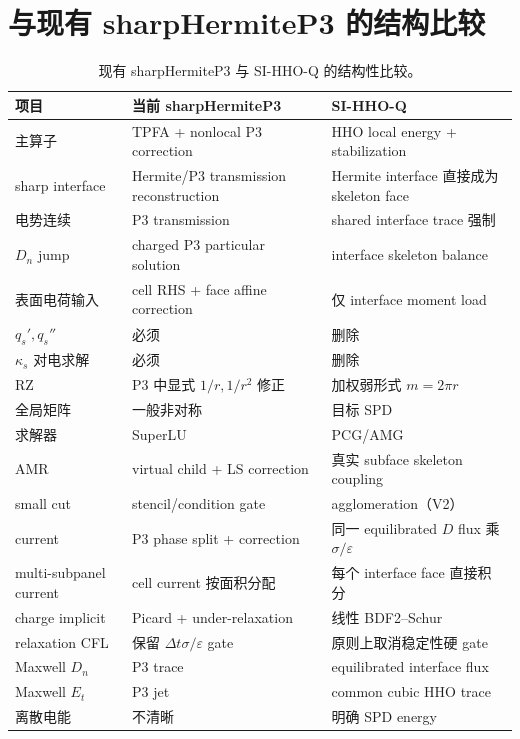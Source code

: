 \documentclass[UTF8,a4paper,11pt]{ctexart}
\newcommand{\eps}{\varepsilon}
\begin{document}
\section{与现有 sharpHermiteP3 的结构比较}

\begin{table}[htbp]
\centering
\small
\begin{tabularx}{\textwidth}{>{\raggedright\arraybackslash}p{}XX}
\toprule
项目 & 当前 sharpHermiteP3 & SI-HHO-Q \\
\midrule
主算子 & TPFA + nonlocal P3 correction & HHO local energy + stabilization \\
sharp interface & Hermite/P3 transmission reconstruction & Hermite interface 直接成为 skeleton face \\
电势连续 & P3 transmission & shared interface trace 强制 \\
\(D_n\) jump & charged P3 particular solution & interface skeleton balance \\
表面电荷输入 & cell RHS + face affine correction & 仅 interface moment load \\
\(q_s',q_s''\) & 必须 & 删除 \\
\(\kappa_s\) 对电求解 & 必须 & 删除 \\
RZ & P3 中显式 \(1/r,1/r^2\) 修正 & 加权弱形式 \(m=2\pi r\) \\
全局矩阵 & 一般非对称 & 目标 SPD \\
求解器 & SuperLU & PCG/AMG \\
AMR & virtual child + LS correction & 真实 subface skeleton coupling \\
small cut & stencil/condition gate & agglomeration（V2） \\
current & P3 phase split + correction & 同一 equilibrated \(D\) flux 乘 \(\sigma/\eps\) \\
multi-subpanel current & cell current 按面积分配 & 每个 interface face 直接积分 \\
charge implicit & Picard + under-relaxation & 线性 BDF2--Schur \\
relaxation CFL & 保留 \(\Delta t\sigma/\eps\) gate & 原则上取消稳定性硬 gate \\
Maxwell \(D_n\) & P3 trace & equilibrated interface flux \\
Maxwell \(E_t\) & P3 jet & common cubic HHO trace \\
离散电能 & 不清晰 & 明确 SPD energy \\
\bottomrule
\end{tabularx}
\caption{现有 sharpHermiteP3 与 SI-HHO-Q 的结构性比较。}
\label{tab:comparison}
\end{table}
\end{document}
